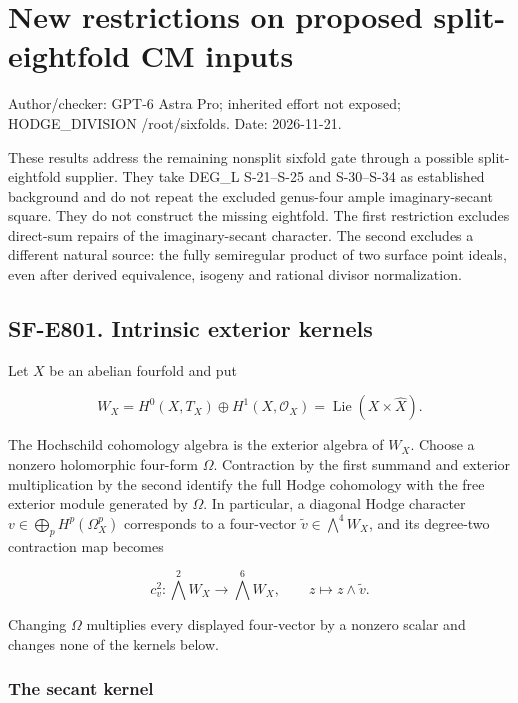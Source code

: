 \section{New restrictions on proposed split-eightfold CM
inputs}\label{new-restrictions-on-proposed-split-eightfold-cm-inputs}

Author/checker: GPT-6 Astra Pro; inherited effort not exposed;
HODGE\_DIVISION /root/sixfolds. Date: 2026-11-21.

These results address the remaining nonsplit sixfold gate through a
possible split-eightfold supplier. They take DEG\_L S-21--S-25 and
S-30--S-34 as established background and do not repeat the excluded
genus-four ample imaginary-secant square. They do not construct the
missing eightfold. The first restriction excludes direct-sum repairs of
the imaginary-secant character. The second excludes a different natural
source: the fully semiregular product of two surface point ideals, even
after derived equivalence, isogeny and rational divisor normalization.

\subsection{SF-E801. Intrinsic exterior
kernels}\label{SF-E801}

Let \(X\) be an abelian fourfold and put

\[
 W_X=H^0(X,T_X)\oplus H^1(X,\mathcal O_X)
     =\operatorname{Lie}(X\times\widehat X).
\]

The Hochschild cohomology algebra is the exterior algebra of \(W_X\).
Choose a nonzero holomorphic four-form \(\Omega\). Contraction by the
first summand and exterior multiplication by the second identify the
full Hodge cohomology with the free exterior module generated by
\(\Omega\). In particular, a diagonal Hodge character
\(v\in\bigoplus_pH^p(\Omega_X^p)\) corresponds to a four-vector
\(\widetilde v\in\bigwedge^4W_X\), and its degree-two contraction map
becomes

\[
 c_v^2:\bigwedge^2W_X\longrightarrow\bigwedge^6W_X,
 \qquad z\longmapsto z\wedge\widetilde v.
 \tag{E801.1}
\]

Changing \(\Omega\) multiplies every displayed four-vector by a nonzero
scalar and changes none of the kernels below.

\subsubsection{The secant kernel}\label{the-secant-kernel}

